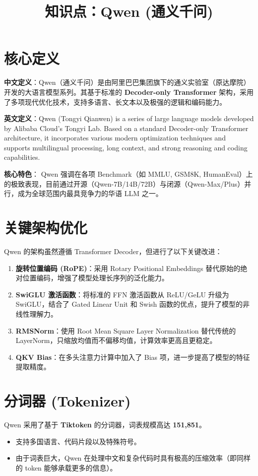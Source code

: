 \documentclass[12pt, a4paper]{article}
\title{知识点：Qwen (通义千问)}
\author{}
\date{}
\begin{document}
\maketitle

\section{核心定义}
\textbf{中文定义}：Qwen（通义千问）是由阿里巴巴集团旗下的通义实验室（原达摩院）开发的大语言模型系列。其基于标准的 \textbf{Decoder-only Transformer} 架构，采用了多项现代优化技术，支持多语言、长文本以及极强的逻辑和编码能力。

\textbf{英文定义}：Qwen (Tongyi Qianwen) is a series of large language models developed by Alibaba Cloud's Tongyi Lab. Based on a standard Decoder-only Transformer architecture, it incorporates various modern optimization techniques and supports multilingual processing, long context, and strong reasoning and coding capabilities.

\textbf{核心特色}：
Qwen 强调在各项 Benchmark（如 MMLU, GSM8K, HumanEval）上的极致表现，目前通过开源（Qwen-7B/14B/72B）与闭源（Qwen-Max/Plus）并行，成为全球范围内最具竞争力的华语 LLM 之一。

\section{关键架构优化}
Qwen 的架构虽然遵循 Transformer Decoder，但进行了以下关键改进：

\begin{enumerate}
    \item \textbf{旋转位置编码 (RoPE)}：采用 Rotary Positional Embeddings 替代原始的绝对位置编码，增强了模型处理长序列的泛化能力。
    \item \textbf{SwiGLU 激活函数}：将标准的 FFN 激活函数从 ReLU/GeLU 升级为 SwiGLU，结合了 Gated Linear Unit 和 Swish 函数的优点，提升了模型的非线性理解力。
    \item \textbf{RMSNorm}：使用 Root Mean Square Layer Normalization 替代传统的 LayerNorm，只缩放均值而不偏移均值，计算效率更高且更稳定。
    \item \textbf{QKV Bias}：在多头注意力计算中加入了 Bias 项，进一步提高了模型的特征提取精度。
\end{enumerate}

\section{分词器 (Tokenizer)}
Qwen 采用了基于 \textbf{Tiktoken} 的分词器，词表规模高达 \textbf{151,851}。
\begin{itemize}
    \item 支持多国语言、代码片段以及特殊符号。
    \item 由于词表巨大，Qwen 在处理中文和复杂代码时具有极高的压缩效率（即同样的 token 能够承载更多的信息）。
\end{itemize}
\end{document}
